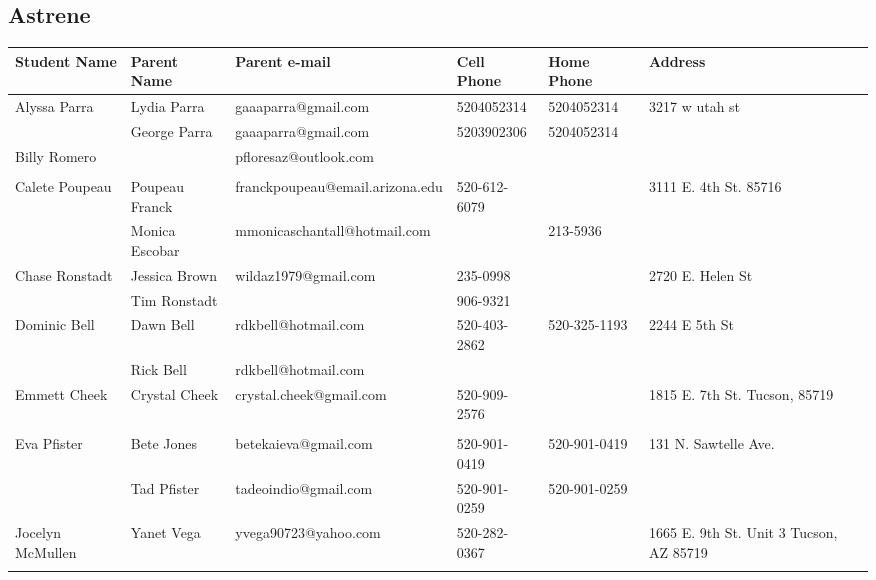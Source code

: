 \documentclass[landscape]{article}\usepackage[]{graphicx}\usepackage[]{color}
\begin{document}
\subsection{Astrene}
\begin{longtable}{|p{100pt}|p{100pt}|p{140pt}|p{60pt}|p{64pt}|p{120pt}|}
\textbf{Student Name} & \textbf{Parent Name} & \textbf{Parent e-mail} & \textbf{Cell Phone} & \textbf{Home Phone} & \textbf{Address}\\
\hline
\hline
\multirow{2}{100pt}{Alyssa Parra} & Lydia Parra & gaaaparra@gmail.com & 5204052314 & 5204052314 & \multirow{2}{120pt}{3217 w utah st} \\
 & George Parra & gaaaparra@gmail.com & 5203902306 & 5204052314 & \\
\hline
\multirow{2}{100pt}{Billy Romero} &  & pfloresaz@outlook.com &  &  & \multirow{2}{120pt}{} \\
 &  &  &  &  & \\
\hline
\multirow{2}{100pt}{Calete Poupeau} & Poupeau Franck & franckpoupeau@email.arizona.edu & 520-612-6079 &  & \multirow{2}{120pt}{3111 E. 4th St. 85716} \\
 & Monica Escobar & mmonicaschantall@hotmail.com &  & 213-5936 & \\
\hline
\multirow{2}{100pt}{Chase Ronstadt} & Jessica Brown & wildaz1979@gmail.com & 235-0998 &  & \multirow{2}{120pt}{2720 E. Helen St} \\
 & Tim Ronstadt &  & 906-9321 &  & \\
\hline
\multirow{2}{100pt}{Dominic Bell} & Dawn Bell & rdkbell@hotmail.com & 520-403-2862 & 520-325-1193 & \multirow{2}{120pt}{2244 E 5th St} \\
 & Rick Bell & rdkbell@hotmail.com &  &  & \\
\hline
\multirow{2}{100pt}{Emmett Cheek} & Crystal Cheek & crystal.cheek@gmail.com & 520-909-2576 &  & \multirow{2}{120pt}{1815 E. 7th St. Tucson, 85719} \\
 &  &  &  &  & \\
\hline
\multirow{2}{100pt}{Eva Pfister} & Bete Jones & betekaieva@gmail.com & 520-901-0419 & 520-901-0419 & \multirow{2}{120pt}{131 N. Sawtelle Ave.} \\
 & Tad Pfister & tadeoindio@gmail.com & 520-901-0259 & 520-901-0259 & \\
\hline
\multirow{2}{100pt}{Jocelyn McMullen} & Yanet Vega & yvega90723@yahoo.com & 520-282-0367 &  & \multirow{2}{120pt}{1665 E. 9th St. Unit 3 Tucson, AZ 85719} \\
 &  &  &  &  & \\

\end{longtable}
\end{document}
